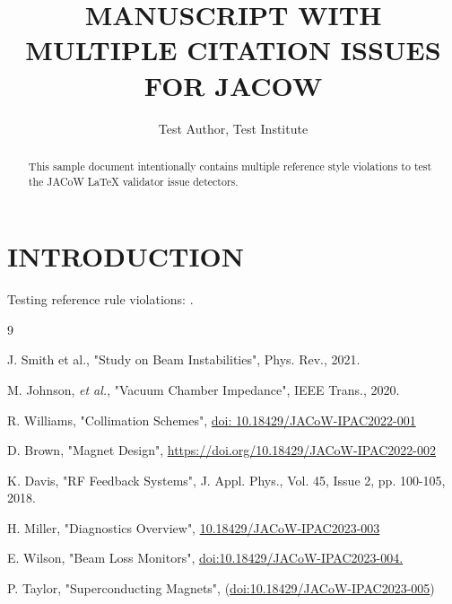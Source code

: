 \documentclass[a4paper]{jacow}
\begin{document}
\title{MANUSCRIPT WITH MULTIPLE CITATION ISSUES FOR JACOW}
\author{Test Author, Test Institute}
\maketitle

\begin{abstract}
This sample document intentionally contains multiple reference style violations to test the JACoW LaTeX validator issue detectors.
\end{abstract}

\section{INTRODUCTION}
Testing reference rule violations:
\cite{bad_etal, bad_comma, bad_doi_space, bad_doi_url, bad_vol_issue, bad_no_prefix, bad_doi_period, bad_paren}.

\begin{thebibliography}{9}

J. Smith et al., "Study on Beam Instabilities", Phys. Rev., 2021.

M. Johnson, \textit{et al.}, "Vacuum Chamber Impedance", IEEE Trans., 2020.

R. Williams, "Collimation Schemes", \url{doi: 10.18429/JACoW-IPAC2022-001}

D. Brown, "Magnet Design", \url{https://doi.org/10.18429/JACoW-IPAC2022-002}

K. Davis, "RF Feedback Systems", J. Appl. Phys., Vol. 45, Issue 2, pp. 100-105, 2018.

H. Miller, "Diagnostics Overview", \url{10.18429/JACoW-IPAC2023-003}

E. Wilson, "Beam Loss Monitors", \url{doi:10.18429/JACoW-IPAC2023-004.}

P. Taylor, "Superconducting Magnets", (\url{doi:10.18429/JACoW-IPAC2023-005})

\end{thebibliography}
\end{document}
